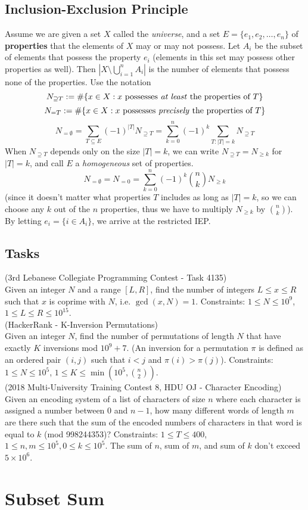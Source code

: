 \documentclass[12pt]{extarticle}
\begin{document}
\subsection*{Inclusion-Exclusion Principle}
Assume we are given a set $X$ called the \emph{universe}, and a set $E=\{e_{1},e_{2},\dots,e_{n}\}$ of \textbf{properties} that the elements of $X$ may or may not possess. Let $A_{i}$ be the subset of elements that possess the property $e_{i}$ (elements in this set may possess other properties as well). Then $| X\setminus \bigcup_{i=1}^{n}A_{i} |$ is the number of elements that possess none of the properties. Use the notation $$N_{\supseteq T}:=\text{\#}\{x\in X:x \text{ possesses \emph{at least} the properties of }T\}$$
$$N_{= T}:=\text{\#}\{x\in X:x \text{ possesses \emph{precisely} the properties of }T\}$$
$$N_{=\emptyset}=\sum_{T\subseteq E}(-1)^{|T|}N_{\supseteq T}=\sum_{k=0}^{n}(-1)^{k}\sum_{T:|T|=k}N_{\supseteq T}$$
When $N_{\supseteq T}$ depends only on the size $|T|=k$, we can write $N_{\supseteq T}=N_{\geq k}$ for $|T|=k$, and call $E$ a \emph{homogeneous} set of properties. 
$$N_{=\emptyset}=N_{=0}=\sum_{k=0}^{n}(-1)^{k}{n\choose k} N_{\geq k}$$
(since it doesn't matter what properties $T$ includes as long as $|T|=k$, so we can choose any $k$ out of the $n$ properties, thus we have to multiply $N_{\geq k}$ by $n\choose k$).
By letting $e_{i}=\{i\in A_{i}\}$, we arrive at the restricted IEP.
\subsection*{Tasks} 
(3rd Lebanese Collegiate Programming Contest - Task 4135) \\ 
Given an integer $N$ and a range $[L, R]$, find the number of integers $L\leq x\leq R$ such that $x$ is coprime with $N$, i.e. $\gcd(x, N) = 1$. Constraints: $1\leq N \leq 10^{9}$, $1\leq L\leq R\leq 10^{15}$.\\

\noindent (HackerRank - K-Inversion Permutations)\\
Given an integer $N$, find the number of permutations of length $N$ that have exactly $K$ inversions mod $10^{9}+7$. (An inversion for a permutation $\pi$ is defined as an ordered pair $(i, j)$ such that $i<j$ and $\pi(i)>\pi(j)$). Constraints: $1\leq N\leq 10^{5}$, $1\leq K\leq \min(10^{5},{n\choose 2})$.\\

\noindent (2018 Multi-University Training Contest 8, HDU OJ - Character Encoding)\\
Given an encoding system of a list of characters of size $n$ where each character is assigned a number between 0 and $n-1$, how many different words of length $m$ are there such that the sum of the encoded numbers of characters in that word is equal to $k$ (mod 998244353)? Constraints: $1\leq T\leq 400$, $1\leq n,m\leq 10^{5}, 0\leq k\leq 10^{5}$. The sum of $n$, sum of $m$, and sum of $k$ don't exceed $5\times 10^{6}$.

\newpage
\section*{Subset Sum}
\end{document}
